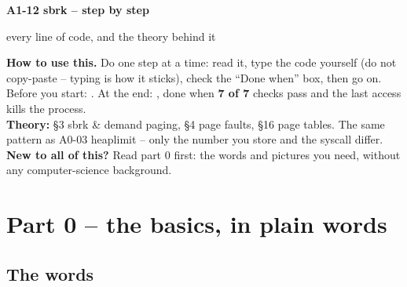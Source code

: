 \documentclass[11pt]{report}
\begin{document}
{\centering
  {\LARGE\bfseries A1-12 sbrk -- step by step\par}
  \vspace{4pt}
  {\large every line of code, and the theory behind it\par}
  \vspace{8pt}
}

\begin{infobox}
\textbf{How to use this.} Do one step at a time: read it, type the code yourself (do not copy-paste --
typing is how it sticks), check the ``Done when'' box, then go on. Before you start:
. At the end: , done when \textbf{7 of 7} checks pass and the
last access kills the process.\\[3pt]
\textbf{Theory:}  \S3 sbrk \& demand paging, \S4 page faults, \S16 page tables.
The same pattern as A0-03 heaplimit -- only the number you store and the syscall differ.\\[3pt]
\textbf{New to all of this?} Read part 0 first: the words and pictures you need, without any
computer-science background.
\end{infobox}

\section*{Part 0 -- the basics, in plain words}

\subsection*{The words}
\end{document}
